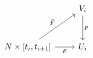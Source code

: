 \documentclass{article}
\begin{document}
    \begin{equation*}
        \begin{tikzcd}[row sep = 0.4in]
            & V_i \ar[d, "p"] \\
            N\times\l[t_i,t_{i+1}\r] \ar[r, "F"'] \ar[ur, "\tilde{F}"] & U_i
        \end{tikzcd}
    \end{equation*}
\end{document}
